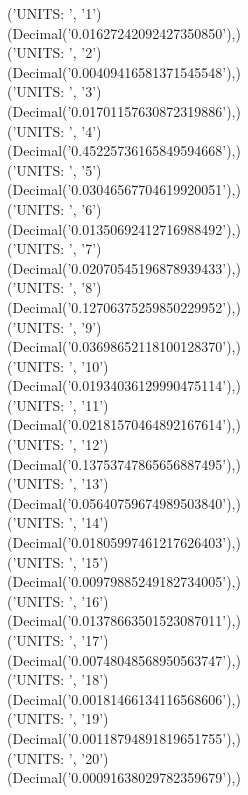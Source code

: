 ('UNITS: ', '1') \\
(Decimal('0.01627242092427350850'),) \\
('UNITS: ', '2')\\
(Decimal('0.00409416581371545548'),) \\
('UNITS: ', '3') \\
(Decimal('0.01701157630872319886'),) \\
('UNITS: ', '4') \\
(Decimal('0.45225736165849594668'),) \\
('UNITS: ', '5') \\
(Decimal('0.03046567704619920051'),) \\
('UNITS: ', '6') \\
(Decimal('0.01350692412716988492'),) \\
('UNITS: ', '7') \\
(Decimal('0.02070545196878939433'),) \\
('UNITS: ', '8') \\
(Decimal('0.12706375259850229952'),) \\
('UNITS: ', '9') \\
(Decimal('0.03698652118100128370'),) \\
('UNITS: ', '10') \\
(Decimal('0.01934036129990475114'),) \\
('UNITS: ', '11') \\
(Decimal('0.02181570464892167614'),) \\
('UNITS: ', '12') \\
(Decimal('0.13753747865656887495'),) \\
('UNITS: ', '13') \\
(Decimal('0.05640759674989503840'),) \\
('UNITS: ', '14') \\
(Decimal('0.01805997461217626403'),) \\
('UNITS: ', '15') \\
(Decimal('0.00979885249182734005'),) \\
('UNITS: ', '16') \\
(Decimal('0.01378663501523087011'),) \\
('UNITS: ', '17') \\
(Decimal('0.00748048568950563747'),) \\
('UNITS: ', '18') \\
(Decimal('0.00181466134116568606'),) \\
('UNITS: ', '19') \\
(Decimal('0.00118794891819651755'),) \\
('UNITS: ', '20') \\
(Decimal('0.00091638029782359679'),) \\

